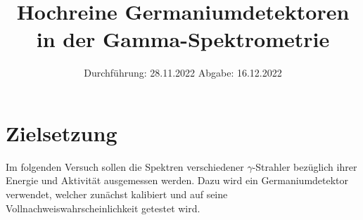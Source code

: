 

\subject{V18}
\title{Hochreine Germaniumdetektoren in der Gamma-Spektrometrie}
\date{
    Durchführung: 28.11.2022
     \hspace{3em}
    Abgabe: 16.12.2022
}


\maketitle
\thispagestyle{empty}
\tableofcontents
\newpage

\section{Zielsetzung}

    Im folgenden Versuch sollen die Spektren verschiedener $\gamma$-Strahler bezüglich ihrer Energie und Aktivität ausgemessen werden.
    Dazu wird ein Germaniumdetektor verwendet,
    welcher zunächst kalibiert und auf seine Vollnachweiswahrscheinlichkeit getestet wird.


\clearpage


\clearpage


\clearpage


\clearpage

\printbibliography


